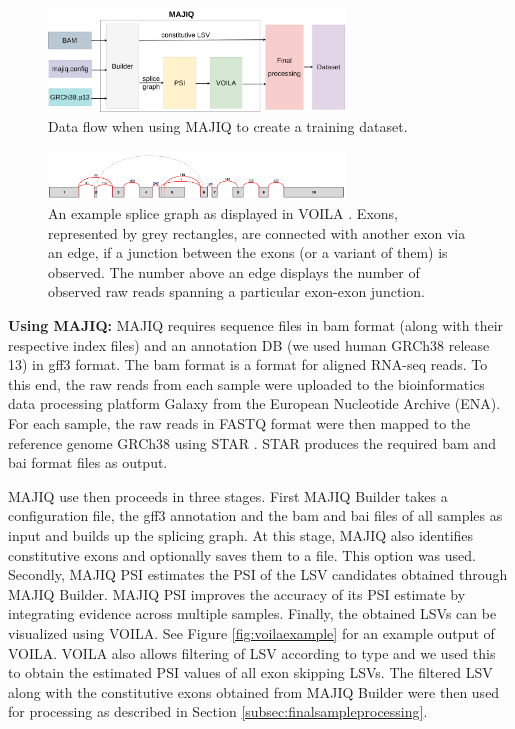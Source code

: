 \begin{figure}
	\centering\includegraphics[width=0.7\textwidth]{../visualizations/ch4-methods/visualizations-majiq.pdf} 
	\caption{Data flow when using MAJIQ to create a training dataset. }
	\label{fig:majiq_dataset_creation_process}
\end{figure}

\begin{figure}
	\centering\includegraphics[width=0.7\textwidth]{../visualizations/ch4-methods/splice_graph.png} 
	\caption{An example splice graph as displayed in VOILA \cite{majiq2}. Exons, represented by grey rectangles, are connected with another exon via an edge, if a junction between the exons (or a variant of them) is observed. The number above an edge displays the number of observed raw reads spanning a particular exon-exon junction.}
	\label{fig:splice_graph}
\end{figure}

\textbf{Using MAJIQ:} MAJIQ requires sequence files in bam format (along with their respective index files) and an annotation DB (we used human GRCh38 release 13) in gff3 format. The bam format is a format for aligned RNA-seq reads. 
To this end, the raw reads from each sample were uploaded to the bioinformatics data processing platform Galaxy \cite{galaxy} from the European Nucleotide Archive (ENA). For each sample, the raw reads in FASTQ format were then mapped to the reference genome GRCh38 \cite{hg38} using STAR \cite{star}. STAR produces the required bam and bai format files as output.

MAJIQ use then proceeds in three stages. First MAJIQ Builder takes a configuration file, the gff3 annotation and the bam and bai files of all samples as input and builds up the splicing graph. At this stage, MAJIQ also identifies constitutive exons and optionally saves them to a file. This option was used.
Secondly, MAJIQ PSI estimates the PSI of the LSV candidates obtained through MAJIQ Builder. MAJIQ PSI improves the accuracy of its PSI estimate by integrating evidence across multiple samples.
Finally, the obtained LSVs can be visualized using VOILA. See Figure \ref{fig:voilaexample} for an example output of VOILA. VOILA also allows filtering of LSV according to type and we used this to obtain the estimated PSI values of all exon skipping LSVs. The filtered LSV along with the constitutive exons obtained from MAJIQ Builder were then used for processing as described in Section \ref{subsec:finalsampleprocessing}.\\


